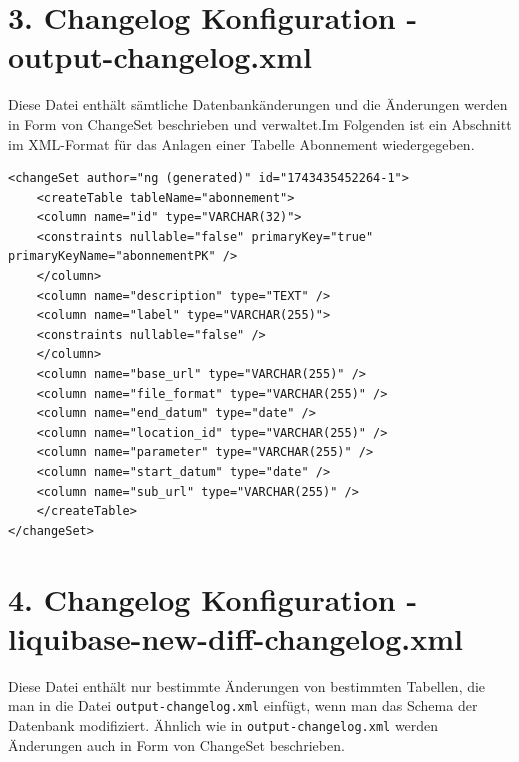 \documentclass[a4paper,12pt]{scrreprt}
\begin{document}
	\section*{\small \textbf{3. Changelog Konfiguration - output-changelog.xml}}
	Diese Datei enthält sämtliche Datenbankänderungen und die Änderungen werden in Form von ChangeSet beschrieben und verwaltet.Im Folgenden ist ein Abschnitt im XML-Format für das Anlagen einer Tabelle Abonnement wiedergegeben. \\ 
\begin{lstlisting}
<changeSet author="ng (generated)" id="1743435452264-1">
	<createTable tableName="abonnement">
	<column name="id" type="VARCHAR(32)">
	<constraints nullable="false" primaryKey="true" primaryKeyName="abonnementPK" />
	</column>
	<column name="description" type="TEXT" />
	<column name="label" type="VARCHAR(255)">
	<constraints nullable="false" />
	</column>
	<column name="base_url" type="VARCHAR(255)" />
	<column name="file_format" type="VARCHAR(255)" />
	<column name="end_datum" type="date" />
	<column name="location_id" type="VARCHAR(255)" />
	<column name="parameter" type="VARCHAR(255)" />
	<column name="start_datum" type="date" />
	<column name="sub_url" type="VARCHAR(255)" />
	</createTable>
</changeSet>
\end{lstlisting}
	\section*{\small \textbf{4. Changelog Konfiguration - liquibase-new-diff-changelog.xml}}
	Diese Datei enthält nur bestimmte Änderungen von bestimmten Tabellen, die man in die Datei \texttt{output-changelog.xml} einfügt, wenn man das Schema der Datenbank modifiziert. Ähnlich wie in \texttt{output-changelog.xml} werden Änderungen auch in Form von ChangeSet beschrieben.
	
\end{document}
